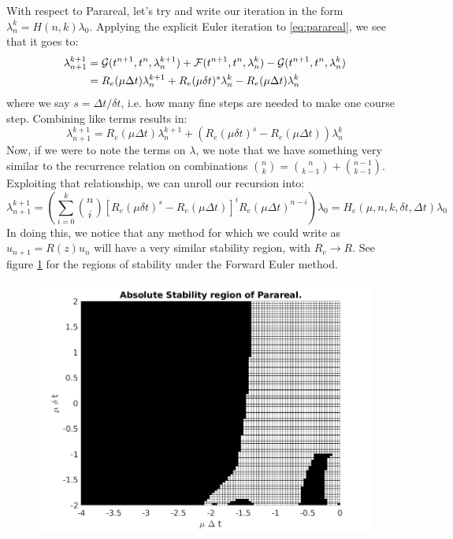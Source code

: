 With respect to Parareal, let's try and write our iteration in the form
$\lambda_n^k = H(n,k)\lambda_0$. Applying the explicit Euler iteration to
\ref{eq:parareal}, we see that it goes to:
\begin{align*}
  \lambda_{n+1}^{k+1} & = \mathcal{G}(t^{n+1},t^n,\lambda_n^{k+1}) +
  \mathcal{F}(t^{n+1},t^n,\lambda_n^k) -
  \mathcal{G}(t^{n+1},t^n,\lambda_n^k) \\
  & = R_e(\mu\Delta t)\lambda_n^{k+1} + 
  R_e(\mu\delta t)^s \lambda_n^k -
  R_e(\mu\Delta t)\lambda_n^k \\
\end{align*}
where we say $s = \Delta t/ \delta t$, i.e. how many fine steps are needed to
make one course step. Combining like terms results in:
\[
  \lambda_{n+1}^{k+1} = 
  R_e(\mu\Delta t)\lambda_n^{k+1} + 
  \left( R_e(\mu\delta t)^s - R_e(\mu\Delta t)\right) \lambda_n^k 
\]
Now, if we were to note the terms on $\lambda$, we note that we have something
very similar to the recurrence relation on combinations $\binom{n}{k} =
\binom{n}{k-1} + \binom{n-1}{k-1}$. Exploiting that relationship, we can unroll
our recursion into:
\[
  \lambda_{n+1}^{k+1} = \left( \sum_{i=0}^k \binom{n}{i} \left[R_e(\mu \delta t)^s -
    R_e(\mu \Delta t)\right]^i R_e(\mu \Delta t)^{n-i} \right) \lambda_0 =
    H_e(\mu, n,k,\delta t, \Delta t) \lambda_0
\]
In doing this, we notice that any method for which we could write as $u_{n+1} =
R(z) u_n$ will have a very similar stability region, with $R_e \to R$. See
figure \ref{fig:stability} for the regions of stability under the Forward Euler
method.

\begin{figure}[!htb]
  \centering
  \includegraphics[width=.8\textwidth]{./resources/stability_fw}
  \caption{}\label{fig:stability}
\end{figure}
